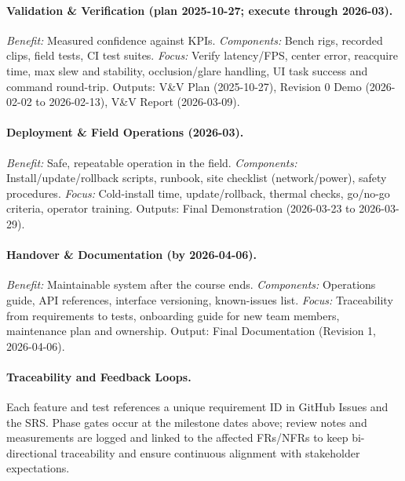 \documentclass[12pt]{article}
\newcommand{\lips}{\textit{Insert your content here.}}
\begin{document}
\paragraph{Validation \& Verification (plan 2025-10-27; execute through 2026-03).}
\emph{Benefit:} Measured confidence against KPIs.
\emph{Components:} Bench rigs, recorded clips, field tests, CI test suites.
\emph{Focus:} Verify latency/FPS, center error, reacquire time, max slew and stability, occlusion/glare handling, UI task success and command round-trip. Outputs: V\&V Plan (2025-10-27), Revision 0 Demo (2026-02-02 to 2026-02-13), V\&V Report (2026-03-09).

\paragraph{Deployment \& Field Operations (2026-03).}
\emph{Benefit:} Safe, repeatable operation in the field.
\emph{Components:} Install/update/rollback scripts, runbook, site checklist (network/power), safety procedures.
\emph{Focus:} Cold-install time, update/rollback, thermal checks, go/no-go criteria, operator training. Outputs: Final Demonstration (2026-03-23 to 2026-03-29).

\paragraph{Handover \& Documentation (by 2026-04-06).}
\emph{Benefit:} Maintainable system after the course ends.
\emph{Components:} Operations guide, API references, interface versioning, known-issues list.
\emph{Focus:} Traceability from requirements to tests, onboarding guide for new team members, maintenance plan and ownership. Output: Final Documentation (Revision 1, 2026-04-06).

\paragraph{Traceability and Feedback Loops.}
Each feature and test references a unique requirement ID in GitHub Issues and
the SRS. Phase gates occur at the milestone dates above; review notes and
measurements are logged and linked to the affected FRs/NFRs to keep
bi-directional traceability and ensure continuous alignment with stakeholder
expectations.

\end{document}
